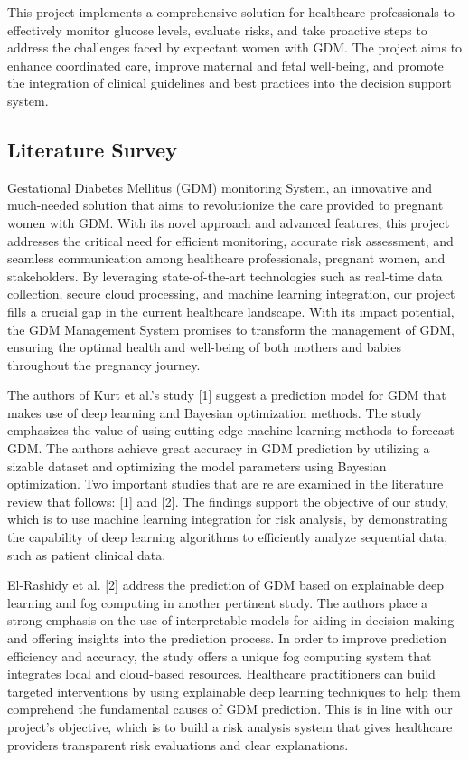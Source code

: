 \documentclass[conference,compsoc]{IEEEtran}
\begin{document}
This project implements a comprehensive solution for healthcare professionals to effectively monitor glucose levels, evaluate risks, and take proactive steps to address the challenges faced by expectant women with GDM. The project aims to enhance coordinated care, improve maternal and fetal well-being, and promote the integration of clinical guidelines and best practices into the decision support system.

\subsection{Literature Survey}
  Gestational Diabetes Mellitus (GDM) monitoring System,  an innovative and much-needed solution that aims to revolutionize the care provided to pregnant women with GDM. With its novel approach and advanced features, this project addresses the critical need for efficient monitoring, accurate risk assessment, and seamless communication among healthcare professionals, pregnant women, and stakeholders. By leveraging state-of-the-art technologies such as real-time data collection, secure cloud processing, and machine learning integration, our project fills a crucial gap in the current healthcare landscape. With its impact potential, the GDM Management System promises to transform the management of GDM, ensuring the optimal health and well-being of both mothers and babies throughout the pregnancy journey.

The authors of Kurt et al.'s study [1] suggest a prediction model for GDM that makes use of deep learning and Bayesian optimization methods. The study emphasizes the value of using cutting-edge machine learning methods to forecast GDM. The authors achieve great accuracy in GDM prediction by utilizing a sizable dataset and optimizing the model parameters using Bayesian optimization.
Two important studies that are re are examined in the literature review that follows: [1] and [2]. The findings support the objective of our study, which is to use machine learning integration for risk analysis, by demonstrating the capability of deep learning algorithms to efficiently analyze sequential data, such as patient clinical data.

El-Rashidy et al. [2] address the prediction of GDM based on explainable deep learning and fog computing in another pertinent study. The authors place a strong emphasis on the use of interpretable models for aiding in decision-making and offering insights into the prediction process. In order to improve prediction efficiency and accuracy, the study offers a unique fog computing system that integrates local and cloud-based resources. Healthcare practitioners can build targeted interventions by using explainable deep learning techniques to help them comprehend the fundamental causes of GDM prediction. This is in line with our project's objective, which is to build a risk analysis system that gives healthcare providers transparent risk evaluations and clear explanations.
\end{document}

